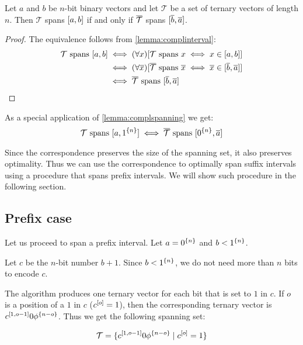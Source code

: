 \begin{lemma}
\label{lemma:complspanning}
Let $a$ and $b$ be $n$-bit binary vectors
and let $\mathcal{T}$ be a set of ternary vectors of length $n$.
Then
$\mathcal{T}$ spans $[a, b]$
if and only if
$\overline{\mathcal{T}}$ spans $[\overline{b}, \overline{a}]$.
\end{lemma}

\begin{proof}
The equivalence follows from \cref{lemma:complinterval}:
\begin{align*}
\mathcal{T} \text{ spans } [a, b]
&\iff (\forall x) [\mathcal{T} \text{ spans } x \iff x \in [a, b]] \\
&\iff (\forall \overline{x}) [\overline{\mathcal{T}} \text{ spans } \overline{x} \iff \overline{x} \in [\overline{b}, \overline{a}]] \\
&\iff \overline{\mathcal{T}} \text{ spans } [\overline{b}, \overline{a}]
\end{align*}
\end{proof}

As a special application of \cref{lemma:complspanning}
we get:
$$
\mathcal{T} \text{ spans } [a, 1^{\{n\}}]
\iff
\overline{\mathcal{T}}
\text{ spans } [0^{\{n\}}, \overline{a}]
$$

Since the correspondence preserves
the size of the spanning set,
it also preserves optimality.
Thus we can use the correspondence to optimally span
suffix intervals
using a procedure that spans prefix intervals.
We will show such procedure in the following section.

\subsection{Prefix case}
\label{sec:prefix}

Let us proceed to span a prefix interval.
Let $a = 0^{\{n\}}$ and $b < 1^{\{n\}}$.

Let $c$ be the $n$-bit number $b + 1$.
Since $b < 1^{\{n\}}$,
we do not need more than $n$ bits to encode $c$.

The algorithm produces one ternary vector
for each bit that is set to $1$ in $c$.
If $o$ is a position of a $1$ in $c$
($c^{[o]} = 1$),
then the corresponding ternary vector
is $c^{[1, o - 1]} 0 \phi^{\{n - o\}}$.
Thus we get the following spanning set:

\begin{equation*}
\mathcal{T} =
\{c^{[1, o - 1]} 0 \phi^{\{n - o\}} \mid c^{[o]} = 1\}
\end{equation*}

